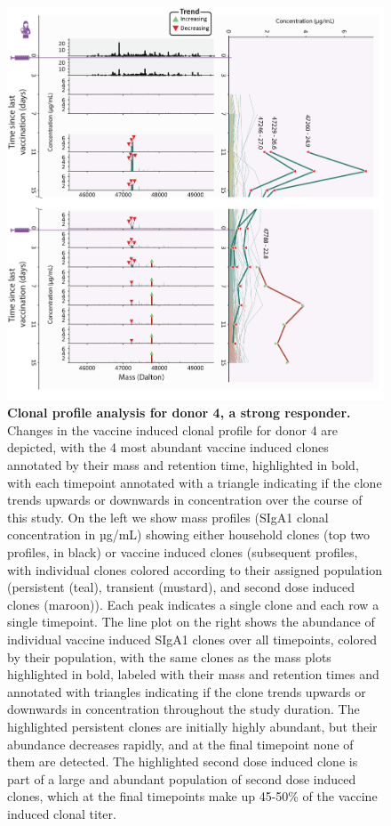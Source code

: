 \begin{figure}[!htb]
  \center
  \includegraphics[]{Chapter.4/Figures/f4.png}
  \caption{\textbf{Clonal profile analysis for donor 4, a strong responder.} Changes in the vaccine induced clonal profile for donor 4 are depicted, with the 4 most abundant vaccine induced clones annotated by their mass and retention time, highlighted in bold, with each timepoint annotated with a triangle indicating if the clone trends upwards or downwards in concentration over the course of this study. On the left we show mass profiles (SIgA1 clonal concentration in µg/mL) showing either household clones (top two profiles, in black) or vaccine induced clones (subsequent profiles, with individual clones colored according to their assigned population (persistent (teal), transient (mustard), and second dose induced clones (maroon)). Each peak indicates a single clone and each row a single timepoint. The line plot on the right shows the abundance of individual vaccine induced SIgA1 clones over all timepoints, colored by their population, with the same clones as the mass plots highlighted in bold, labeled with their mass and retention times and annotated with triangles indicating if the clone trends upwards or downwards in concentration throughout the study duration. The highlighted persistent clones are initially highly abundant, but their abundance decreases rapidly, and at the final timepoint none of them are detected. The highlighted second dose induced clone is part of a large and abundant population of second dose induced clones, which at the final timepoints make up 45-50\% of the vaccine induced clonal titer.}
  \label{fig:fig4.4}
\end{figure}
